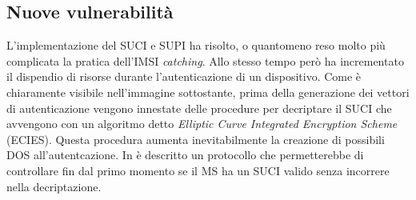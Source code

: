 \subsection{Nuove vulnerabilità}
L'implementazione del SUCI e SUPI ha risolto, o quantomeno reso molto più complicata la pratica dell'IMSI \textit{catching}. Allo stesso tempo però ha incrementato il dispendio di risorse durante l'autenticazione
di un dispositivo. Come è chiaramente visibile nell'immagine sottostante, prima della generazione dei vettori di autenticazione vengono innestate delle procedure per decriptare il SUCI che avvengono con un algoritmo detto 
\textit{Elliptic Curve Integrated Encryption Scheme} (ECIES). 
Questa procedura aumenta inevitabilmente la creazione di possibili DOS all'autentcazione. 
In \cite{5g-lightweight} è descritto un protocollo che permetterebbe di controllare fin dal primo momento se il MS ha un SUCI valido senza incorrere nella decriptazione.
